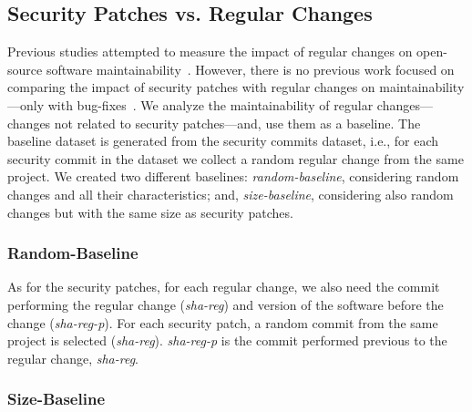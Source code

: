 \documentclass[smallextended]{svjour3}       %
\begin{document}
%
\subsection{Security Patches vs. Regular Changes}
%
Previous studies attempted to measure the impact of regular changes 
on open-source software maintainability~\cite{HEGEDUS2018313}. 
However, there is no previous work focused on comparing the impact 
of security patches with regular changes on maintainability---only
with bug-fixes~\cite{10.1145/3133956.3134072}.
We analyze the maintainability of regular changes---changes not 
related to security patches---and, use them as a baseline.
The baseline dataset is generated from the security commits dataset, i.e.,
for each security commit in the dataset we collect a random regular
change from the same project. We created two different baselines: 
\textit{random-baseline},
considering random changes and all their characteristics; and,
\textit{size-baseline}, considering also random changes
but with the same size as security patches.

\subsubsection{Random-Baseline} 

As for the security patches, for each regular change, we also 
need the commit performing the regular change (\emph{sha-reg}) and version of 
the software before the change (\emph{sha-reg-p}). For each security patch, a 
random commit from the same project is selected (\emph{sha-reg}).
\emph{sha-reg-p} is the commit performed previous to the 
regular change, \emph{sha-reg}.

\subsubsection{Size-Baseline} 
\end{document}

